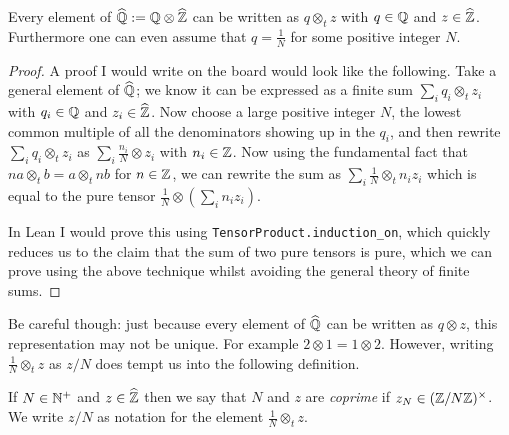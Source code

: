 \begin{lemma}
    \label{QHat.canonicalForm}
     Every element of $\widehat{\mathbb{Q}}:=\mathbb{Q}\otimes\widehat{\mathbb{Z}}$
can be written as $q\otimes_t z$ with $q\in\mathbb{Q}$ and $z\in\widehat{\mathbb{Z}}$.
Furthermore one can even assume that $q=\frac{1}{N}$ for some positive integer $N$.
\end{lemma}
\begin{proof} \leanok
    A proof I would write on the board would look like the following. Take a general
    element of $\widehat{\mathbb{Q}}$; we know it can be expressed as a finite sum
    $\sum_i q_i\otimes_t z_i$ with $q_i\in\mathbb{Q}$ and $z_i\in\widehat{\mathbb{Z}}$. Now choose a large
    positive integer $N$, the lowest common multiple of all the denominators showing up in the
    $q_i$, and then rewrite $\sum_i q_i\otimes_t z_i$ as $\sum_i \frac{n_i}{N}\otimes z_i$ with
    $n_i\in\mathbb{Z}$. Now using the fundamental fact that $na\otimes_t b=a\otimes_t nb$ for $n\in\mathbb{Z}$,
    we can rewrite the sum as $\sum_i \frac{1}{N}\otimes_t n_i z_i$
    which is equal to the pure tensor $\frac{1}{N}\otimes(\sum_i n_i z_i)$.

    In Lean I would prove this using {\tt TensorProduct.induction\_on}, which quickly
    reduces us to the claim that the sum of two pure tensors is pure, which we can prove
    using the above technique whilst avoiding the general theory of finite sums.
\end{proof}

Be careful though: just because every element of $\widehat{\mathbb{Q}}$ can be written as $q\otimes z$, this
representation may not be unique. For example $2\otimes 1=1\otimes 2$. However, writing
$\frac{1}{N}\otimes_t z$ as $z/N$ does tempt us into the following definition.

\begin{definition}
    \label{QHat.IsCoprime}
    \leanok
    If $N\in\mathbb{N}^+$ and $z\in\widehat{\mathbb{Z}}$ then we say that $N$ and $z$ are \emph{coprime} if
    $z_N\in(\mathbb{Z}/N\mathbb{Z})^\times$. We write $z/N$ as notation
    for the element $\frac{1}{N}\otimes_tz$.
\end{definition}

